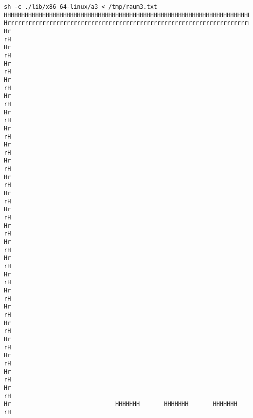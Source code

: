 \documentclass[10pt,a4paper]{article}
\begin{document}
{\begin{verbatim}
sh -c ./lib/x86_64-linux/a3 < /tmp/raum3.txt 
HHHHHHHHHHHHHHHHHHHHHHHHHHHHHHHHHHHHHHHHHHHHHHHHHHHHHHHHHHHHHHHHHHHHHHHHHHHHHHHHHHHHHHHHHHHHHHHHHHHH
HrrrrrrrrrrrrrrrrrrrrrrrrrrrrrrrrrrrrrrrrrrrrrrrrrrrrrrrrrrrrrrrrrrrrrrrrrrrrrrrrrrrrrrrrrrrrrrrrrrH
Hr                                                                                                rH
Hr                                                                                                rH
Hr                                                                                                rH
Hr                                                                                                rH
Hr                                                                                                rH
Hr                                                                                                rH
Hr                                                                                                rH
Hr                                                                                                rH
Hr                                                                                                rH
Hr                                                                                                rH
Hr                                                                                                rH
Hr                                                                                                rH
Hr                                                                                                rH
Hr                                                                                                rH
Hr                                                                                                rH
Hr                                                                                                rH
Hr                                                                                                rH
Hr                                                                                                rH
Hr                                                                                                rH
Hr                                                                                                rH
Hr                                                                                                rH
Hr                                                                                                rH
Hr                                                                                                rH
Hr                              HHHHHHH       HHHHHHH       HHHHHHH                               rH

\end{verbatim}}
\end{document}
